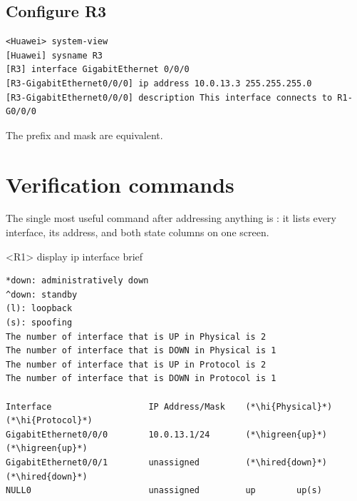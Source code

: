 \subsection{Configure R3}
\begin{lstlisting}[style=utpterminal]
<Huawei> system-view
[Huawei] sysname R3
[R3] interface GigabitEthernet 0/0/0
[R3-GigabitEthernet0/0/0] ip address 10.0.13.3 255.255.255.0
[R3-GigabitEthernet0/0/0] description This interface connects to R1-G0/0/0
\end{lstlisting}

The prefix  and mask  are equivalent.

\section{Verification commands}
The single most useful command after addressing anything is
: it lists every interface, its address,
and both state columns on one screen.

\begin{vrpbox}{<R1> display ip interface brief}
\begin{lstlisting}[style=vrp]
*down: administratively down
^down: standby
(l): loopback
(s): spoofing
The number of interface that is UP in Physical is 2
The number of interface that is DOWN in Physical is 1
The number of interface that is UP in Protocol is 2
The number of interface that is DOWN in Protocol is 1

Interface                   IP Address/Mask    (*\hi{Physical}*)  (*\hi{Protocol}*)
GigabitEthernet0/0/0        10.0.13.1/24       (*\higreen{up}*)        (*\higreen{up}*)
GigabitEthernet0/0/1        unassigned         (*\hired{down}*)      (*\hired{down}*)
NULL0                       unassigned         up        up(s)
\end{lstlisting}
\end{vrpbox}


